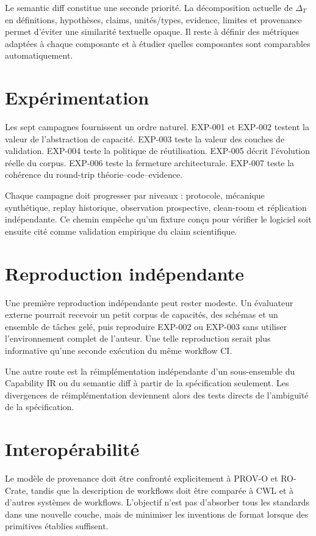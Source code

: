 Le semantic diff constitue une seconde priorité. La décomposition actuelle de $\Delta_T$ en définitions, hypothèses, claims, unités/types, evidence, limites et provenance permet d'éviter une similarité textuelle opaque. Il reste à définir des métriques adaptées à chaque composante et à étudier quelles composantes sont comparables automatiquement.

\section{Expérimentation}

Les sept campagnes fournissent un ordre naturel. EXP-001 et EXP-002 testent la valeur de l'abstraction de capacité. EXP-003 teste la valeur des couches de validation. EXP-004 teste la politique de réutilisation. EXP-005 décrit l'évolution réelle du corpus. EXP-006 teste la fermeture architecturale. EXP-007 teste la cohérence du round-trip théorie--code--evidence.

Chaque campagne doit progresser par niveaux : protocole, mécanique synthétique, replay historique, observation prospective, clean-room et réplication indépendante. Ce chemin empêche qu'un fixture conçu pour vérifier le logiciel soit ensuite cité comme validation empirique du claim scientifique.

\section{Reproduction indépendante}

Une première reproduction indépendante peut rester modeste. Un évaluateur externe pourrait recevoir un petit corpus de capacités, des schémas et un ensemble de tâches gelé, puis reproduire EXP-002 ou EXP-003 sans utiliser l'environnement complet de l'auteur. Une telle reproduction serait plus informative qu'une seconde exécution du même workflow CI.

Une autre route est la réimplémentation indépendante d'un sous-ensemble du Capability IR ou du semantic diff à partir de la spécification seulement. Les divergences de réimplémentation deviennent alors des tests directs de l'ambiguïté de la spécification.

\section{Interopérabilité}

Le modèle de provenance doit être confronté explicitement à PROV-O et RO-Crate, tandis que la description de workflows doit être comparée à CWL et à d'autres systèmes de workflows. L'objectif n'est pas d'absorber tous les standards dans une nouvelle couche, mais de minimiser les inventions de format lorsque des primitives établies suffisent.

